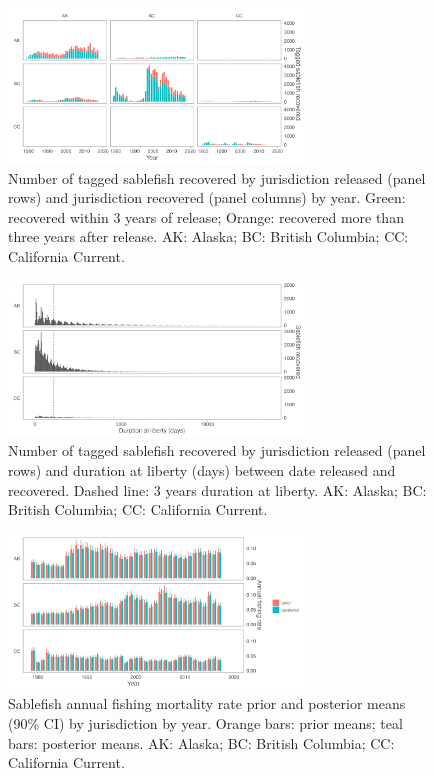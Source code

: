 \documentclass{article}
\begin{document}
\begin{figure}[htb]
    \centering
    \includegraphics[width = 0.7\textwidth]{bar-regions-3-recovered-by-year}
    \caption{Number of tagged sablefish recovered by jurisdiction released (panel rows) and jurisdiction recovered (panel columns) by year. Green: recovered within 3 years of release; Orange: recovered more than three years after release. AK: Alaska; BC: British Columbia; CC: California Current.}
    \label{fig:bar-regions-3-recovered-by-year}
\end{figure}

\begin{figure}[htb]
    \centering
    \includegraphics[width = 0.7\textwidth]{bar-regions-3-duration-at-liberty}
    \caption{Number of tagged sablefish recovered by jurisdiction released (panel rows) and duration at liberty (days) between date released and recovered. Dashed line: 3 years duration at liberty. AK: Alaska; BC: British Columbia; CC: California Current.}
    \label{fig:bar-regions-3-duration-at-liberty}
\end{figure}

\begin{figure}[htb]
    \centering
    \includegraphics[width = 0.7\textwidth]{bar-regions-3-fishing-priors-posteriors}
    \caption{Sablefish annual fishing mortality rate prior and posterior means (90\% CI) by jurisdiction by year. Orange bars: prior means; teal bars: posterior means. AK: Alaska; BC: British Columbia; CC: California Current.}
    \label{fig:bar-regions-3-fishing-priors-posteriors}
\end{figure}
\end{document}

